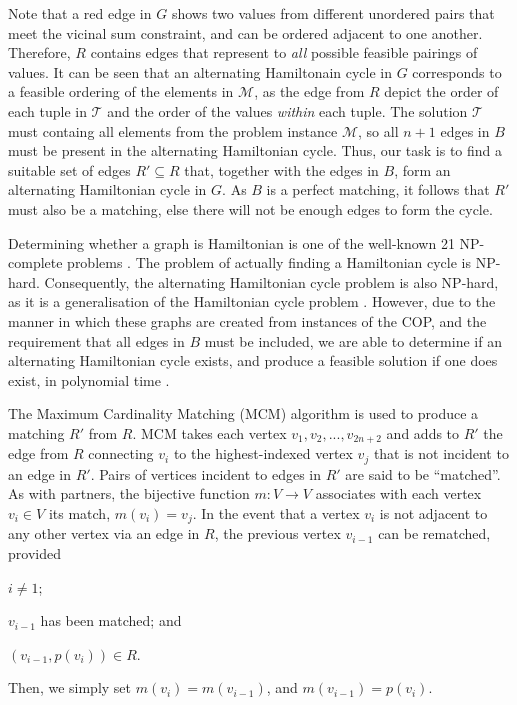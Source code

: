 \documentclass{elsarticle}
\begin{document}
Note that a red edge in $G$ shows two values from different unordered pairs that meet the vicinal sum constraint, and can be ordered adjacent to one another. Therefore, $R$ contains edges that represent to \emph{all} possible feasible pairings of values. It can be seen that an alternating Hamiltonain cycle in $G$ corresponds to a feasible ordering of the elements in $\mathcal{M}$, as the edge from $R$ depict the order of each tuple in $\mathcal{T}$ and the order of the values \emph{within} each tuple. The solution $\mathcal{T}$ must containg all elements from the problem instance $\mathcal{M}$, so all $n+1$ edges in $B$ must be present in the alternating Hamiltonian cycle. Thus, our task is to find a suitable set of edges $R' \subseteq R$ that, together with the edges in $B$, form an alternating Hamiltonian cycle in $G$. As $B$ is a perfect matching, it follows that $R'$ must also be a matching, else there will not be enough edges to form the cycle.

Determining whether a graph is Hamiltonian is one of the well-known 21 NP-complete problems \cite{karp1972}. The problem of actually finding a Hamiltonian cycle is NP-hard. Consequently, the alternating Hamiltonian cycle problem is also NP-hard, as it is a generalisation of the Hamiltonian cycle problem \cite{haggkvist1977}. However, due to the manner in which these graphs are created from instances of the COP, and the requirement that all edges in $B$ must be included, we are able to determine if an alternating Hamiltonian cycle exists, and produce a feasible solution if one does exist, in polynomial time \cite{hawa2018}.

The Maximum Cardinality Matching (MCM) algorithm is used to produce a matching $R'$ from $R$. MCM takes each vertex $v_1, v_2,...,v_{2n+2}$ and adds to $R'$ the edge from $R$ connecting $v_i$ to the highest-indexed vertex $v_j$ that is not incident to an edge in $R'$. Pairs of vertices incident to edges in $R'$ are said to be ``matched''. As with partners, the bijective function $m : V \to V$ associates with each vertex $v_i \in V$ its match, $m(v_i) = v_j$. In the event that a vertex $v_i$ is not adjacent to any other vertex via an edge in $R$, the previous vertex $v_{i-1}$ can be rematched, provided 
\begin{enumerate*}[label={(\alph*)}]
	\item $i \neq 1$;
	\item $v_{i-1}$ has been matched; and
	\item $(v_{i-1}, p(v_i)) \in R$.
\end{enumerate*} 
Then, we simply set $m(v_i) = m(v_{i-1})$, and $m(v_{i-1}) = p(v_i)$.
\end{document}
